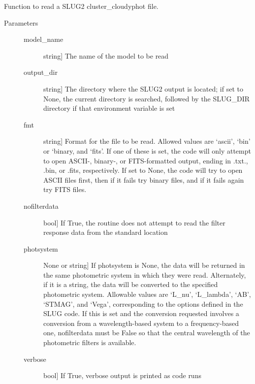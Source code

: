 \documentclass[letterpaper,10pt,english]{sphinxmanual}
\begin{document}
\begin{fulllineitems}
\label{cloudy:slugpy.cloudy.read_cluster_cloudyphot}
Function to read a SLUG2 cluster\_cloudyphot file.
\begin{description}
\item[{Parameters}] \leavevmode\begin{description}
\item[{model\_name}] \leavevmode{[}string{]}
The name of the model to be read

\item[{output\_dir}] \leavevmode{[}string{]}
The directory where the SLUG2 output is located; if set to None,
the current directory is searched, followed by the SLUG\_DIR
directory if that environment variable is set

\item[{fmt}] \leavevmode{[}string{]}
Format for the file to be read. Allowed values are `ascii',
`bin' or `binary, and `fits'. If one of these is set, the code
will only attempt to open ASCII-, binary-, or FITS-formatted
output, ending in .txt., .bin, or .fits, respectively. If set
to None, the code will try to open ASCII files first, then if
it fails try binary files, and if it fails again try FITS
files.

\item[{nofilterdata}] \leavevmode{[}bool{]}
If True, the routine does not attempt to read the filter
response data from the standard location

\item[{photsystem}] \leavevmode{[}None or string{]}
If photsystem is None, the data will be returned in the same
photometric system in which they were read. Alternately, if it
is a string, the data will be converted to the specified
photometric system. Allowable values are `L\_nu', `L\_lambda',
`AB', `STMAG', and `Vega', corresponding to the options defined
in the SLUG code. If this is set and the conversion requested
involves a conversion from a wavelength-based system to a
frequency-based one, nofilterdata must be False so that the
central wavelength of the photometric filters is available.

\item[{verbose}] \leavevmode{[}bool{]}
If True, verbose output is printed as code runs


\end{description}
\end{description}
\end{fulllineitems}
\end{document}
